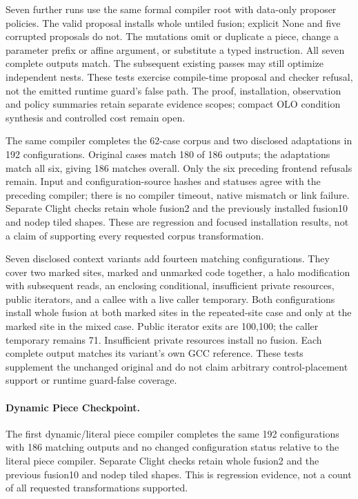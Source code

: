 Seven further runs use the same formal compiler root with data-only proposer
policies. The valid proposal installs whole untiled fusion; explicit None and
five corrupted proposals do not. The mutations omit or duplicate a piece,
change a parameter prefix or affine argument, or substitute a typed instruction.
All seven complete outputs match. The subsequent existing passes may still
optimize independent nests. These tests exercise compile-time proposal and
checker refusal, not the emitted runtime guard's false path. The proof,
installation, observation and policy summaries retain separate evidence scopes;
compact OLO condition synthesis and controlled cost remain open.

The same compiler completes the 62-case corpus and two disclosed adaptations
in 192 configurations. Original cases match 180 of 186 outputs; the adaptations
match all six, giving 186 matches overall. Only the six preceding frontend
refusals remain. Input and configuration-source hashes and statuses agree with
the preceding compiler; there is no compiler timeout, native mismatch or link
failure. Separate Clight checks retain whole fusion2 and the previously installed
fusion10 and nodep tiled shapes. These are regression and focused installation
results, not a claim of supporting every requested corpus transformation.

Seven disclosed context variants add fourteen matching configurations. They
cover two marked sites, marked and unmarked code together, a halo modification
with subsequent reads, an enclosing conditional, insufficient private resources,
public iterators, and a callee with a live caller temporary. Both configurations
install whole fusion at both marked sites in the repeated-site case and only at
the marked site in the mixed case. Public iterator exits are 100,100; the caller
temporary remains 71. Insufficient private resources install no fusion. Each
complete output matches its variant's own GCC reference. These tests supplement
the unchanged original and do not claim arbitrary control-placement support or
runtime guard-false coverage.


\paragraph{Dynamic Piece Checkpoint.}
The first dynamic/literal piece compiler completes the same 192 configurations
with 186 matching outputs and no changed configuration status relative to the
literal piece compiler. Separate Clight checks retain whole fusion2 and the
previous fusion10 and nodep tiled shapes. This is regression evidence, not a
count of all requested transformations supported.

